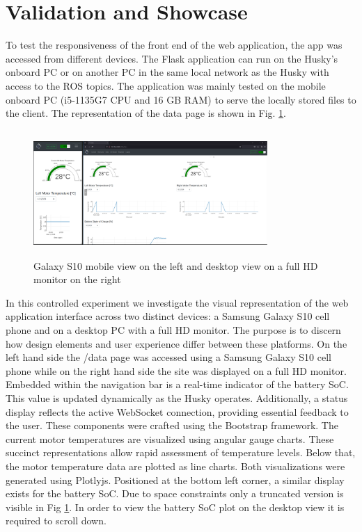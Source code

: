 \documentclass[conference]{IEEEtran}
\begin{document}
\section{Validation and Showcase}\label{VS}
To test the responsiveness of the front end of the web application, the app was accessed from different devices. The Flask application can run on the Husky's onboard PC or on another PC in the same local network as the Husky with access to the ROS topics. The application was mainly tested on the mobile onboard PC (i5-1135G7 CPU and 16 GB RAM) to serve the locally stored files to the client.
The representation of the data page is shown in Fig. \ref{fig:galaxydesktop}. 
\begin{figure}[bp]
    \centerline{\includegraphics[width=8.9cm, height=4.8cm]{Pictures/galaxydesktop.png}}
    \caption{Galaxy S10 mobile view on the left and desktop view on a full HD monitor on the right}
    \label{fig:galaxydesktop}
\end{figure}
In this controlled experiment we investigate the visual representation of the web application interface across two distinct devices: a Samsung Galaxy S10 cell phone and on a desktop PC with a full HD monitor. The purpose is to discern how design elements and user experience differ between these platforms.
On the left hand side the /data page was accessed using a Samsung Galaxy S10 cell phone while on the right hand side the site was displayed on a full HD monitor.
Embedded within the navigation bar is a real-time indicator of the battery SoC. This value is updated dynamically as the Husky operates.
Additionally, a status display reflects the active WebSocket connection, providing essential feedback to the user.
These components were crafted using the Bootstrap framework. The current motor temperatures are visualized using angular gauge charts. These succinct representations allow rapid assessment of temperature levels.
Below that, the motor temperature data are plotted as line charts. Both visualizations were generated using Plotlyjs.
Positioned at the bottom left corner, a similar display exists for the battery SoC. Due to space constraints only a truncated version is visible in Fig \ref{fig:galaxydesktop}. In order to view the battery SoC plot on the desktop view it is required to scroll down. 
\end{document}
